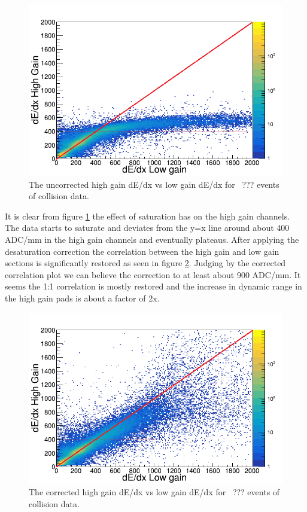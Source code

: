 \documentclass[review]{elsarticle}
\begin{document}
\begin{figure}[ht]
\label{fig:lowvshigh_raw}
\includegraphics[width=\linewidth]{lowvshigh_raw_cuts}
\caption{The uncorrected high gain dE/dx vs low gain dE/dx for ~??? events of collision data.  }
\end{figure}
 
It is clear from figure \ref{fig:lowvshigh_raw} the effect of saturation has on the high gain channels. The data starts to saturate and deviates from the y=x line around about 400 ADC/mm in the high gain channels and eventually plateaus.  After applying the desaturation correction the correlation between the high gain and low gain sections is significantly restored as seen in figure \ref{fig:lowvshigh_desat}. Judging by the corrected correlation plot we can believe the correction to at least about 900 ADC/mm. It seems the 1:1 correlation is mostly restored and the increase in dynamic range in the high gain pads is about a factor of 2x.

\begin{figure}[ht]
\label{fig:lowvshigh_desat}
\includegraphics[width=\linewidth]{lowvshigh_desat}
\caption{The corrected high gain dE/dx vs low gain dE/dx for ~??? events of collision data.  }
\end{figure}
\end{document}
